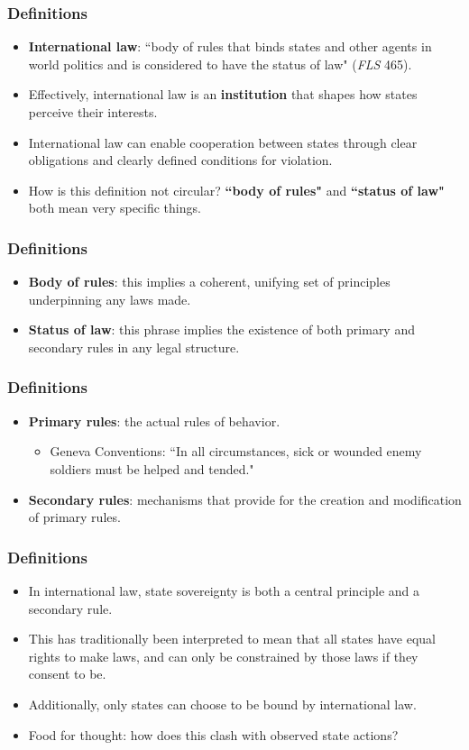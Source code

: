 \documentclass{beamer}
\begin{document}
\begin{frame} 
\frametitle{\LARGE{Definitions}}
\begin{itemize}
		\item \textbf{International law}: ``body of rules that binds states and other agents in world politics and is considered to have the status of law" (\textit{FLS} 465). \pause
		\item Effectively, international law is an \textbf{institution} that shapes how states perceive their interests.
		\item International law can enable cooperation between states through clear obligations and clearly defined conditions for violation. \pause
		\item How is this definition not circular? \pause \textbf{``body of rules"} and \textbf{``status of law"} both mean very specific things.
\end{itemize}
\end{frame}


\begin{frame} 
	\frametitle{\LARGE{Definitions}}
	\begin{itemize}
		\item \textbf{Body of rules}: this implies a coherent, unifying set of principles underpinning any laws made.
		\item \textbf{Status of law}: this phrase implies the existence of both primary and secondary rules in any legal structure. 
	\end{itemize}
\end{frame}

\begin{frame} 
	\frametitle{\LARGE{Definitions}}
	\begin{itemize}
		\item \textbf{Primary rules}: the actual rules of behavior.
		\begin{itemize}
			\item Geneva Conventions: ``In all circumstances, sick or wounded enemy soldiers must be helped and tended." \pause
		\end{itemize}
		\item \textbf{Secondary rules}: mechanisms that provide for the creation and modification of primary rules.
	\end{itemize}
\end{frame}

\begin{frame} 
	\frametitle{\LARGE{Definitions}}
	\begin{itemize}
		\item In international law, state sovereignty is both a central principle and a secondary rule. \pause
		\item This has traditionally been interpreted to mean that all states have equal rights to make laws, and can only be constrained by those laws if they consent to be. \pause
		\item Additionally, only states can choose to be bound by international law. \pause
		\item Food for thought: how does this clash with observed state actions?
	\end{itemize}
\end{frame}
\end{document}
